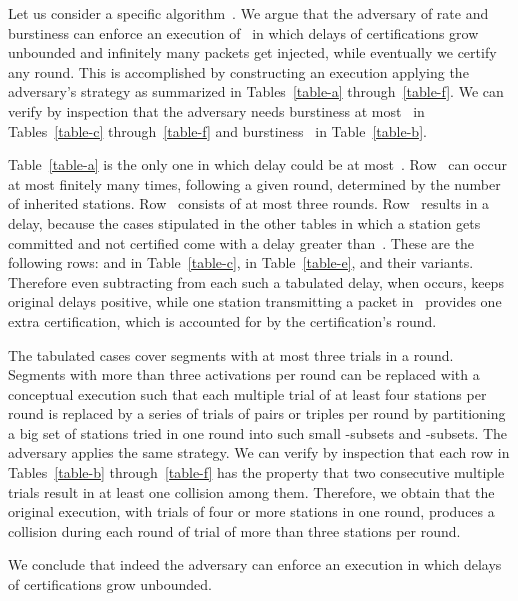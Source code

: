 \documentclass[11pt]{article}
\newcommand{\qed}{\hfill  \smallbreak}
\newenvironment{proof}{\noindent{\bf Proof:}}{\qed}
\begin{document}
\begin{proof} 
Let us consider a specific algorithm~.
We argue that the adversary of rate  and burstiness  can enforce an execution of~ in which delays of certifications grow unbounded and infinitely many packets get injected, while eventually we certify any round.
This is accomplished by constructing an execution applying the adversary's strategy as summarized in Tables~\ref{table-a} through~\ref{table-f}.
We can verify by inspection that the adversary needs burstiness at most~ in Tables~\ref{table-c} through~\ref{table-f} and burstiness~ in Table~\ref{table-b}.

Table~\ref{table-a} is the only one in which delay could be at most~.
Row~ can occur at most finitely many times, following a given round, determined by the number of inherited stations.
Row~ consists of at most three rounds.
Row~ results in a delay, because the cases stipulated in the other tables in which a station gets committed and not certified come with a delay greater than~.
These are the following rows:  and  in Table~\ref{table-c},  in Table~\ref{table-e}, and their variants.
Therefore even subtracting  from each such a tabulated delay, when  occurs, keeps  original delays positive, while one station transmitting a packet in~ provides one extra certification, which is accounted for by the certification's round.

The tabulated cases cover segments with at most three trials in a round.
Segments with more than three activations per round can be replaced with a conceptual execution  such that each multiple trial of at least four stations per round is replaced by a series of trials of pairs or triples per round by partitioning a big set of stations tried in one round into such small -subsets and -subsets.
The adversary applies the same strategy.
We can verify by inspection that each row in Tables~\ref{table-b} through~\ref{table-f} has the property that two consecutive multiple trials result in at least one collision among them.
Therefore, we obtain that the original execution, with trials of  four or more stations in one round, produces a collision during each round of trial of more than three stations per round.

We conclude that indeed the adversary can enforce an execution in which delays of certifications grow unbounded.
\end{proof} 
\end{document}
